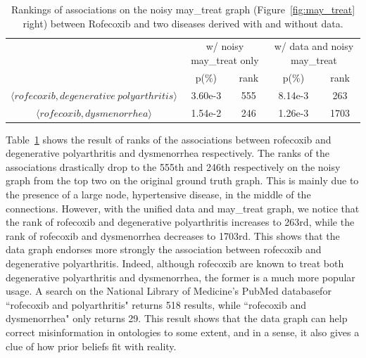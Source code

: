 \begin{table}[htbp]\scriptsize
\begin{center}
\begin{tabular}{ c | c  c | c  c }
\hline
\multirow{2}{*}{~}  &   \multicolumn{2}{c|}{w/ noisy may\_treat only}    &   \multicolumn{2}{c}{w/ data and noisy may\_treat}\\
\cline{2-5}
       	&   p(\%)   &   rank    &  p(\%)    &    rank    \\
\hline
$\langle rofecoxib, degenerative~polyarthritis\rangle$       &   3.60e-3   &   555     &   8.14e-3    &   263    \\
$\langle rofecoxib, dysmenorrhea\rangle$    &   1.54e-2   &   246     &   1.26e-3    &   1703   \\
\hline
\end{tabular}
\end{center}
\caption[Rankings of associations on the noisy may\_treat graph]{\label{tbl:salted_may_treat}Rankings of associations on the noisy may\_treat graph (Figure~\ref{fig:may_treat} right) between Rofecoxib and two diseases derived with and without data.}
\end{table}

Table~\ref{tbl:salted_may_treat} shows the result of ranks of the associations between rofecoxib and degenerative polyarthritis and dysmenorrhea respectively. The ranks of the associations drastically drop to the 555th and 246th respectively on the noisy graph from the top two on the original ground truth graph. This is mainly due to the presence of a large node, hypertensive disease, in the middle of the connections. However, with the unified data and may\_treat graph, we notice that the rank of rofecoxib and degenerative polyarthritis increases to 263rd, while the rank of rofecoxib and  dysmenorrhea decreases to 1703rd. This shows that the data graph endorses more strongly the association between rofecoxib and degenerative polyarthritis. Indeed, although rofecoxib are known to treat both degenerative polyarthritis and dysmenorrhea, the former is a much more popular usage. A search on the National Library of Medicine's PubMed database\footnotemark[1] for ``rofecoxib and polyarthritis" returns 518 results, while ``rofecoxib and dysmenorrhea" only returns 29. This result shows that the data graph can help correct misinformation in ontologies to some extent, and in a sense, it also gives a clue of how prior beliefs fit with reality.


